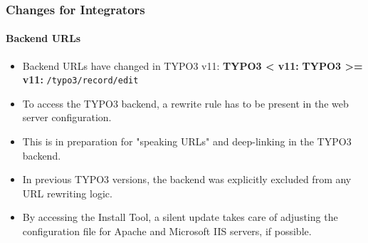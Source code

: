 %

\begin{frame}[fragile]
	\frametitle{Changes for Integrators}
	\framesubtitle{Backend URLs}

	\begin{itemize}
		\item Backend URLs have changed in TYPO3 v11:\newline
			\small\textbf{TYPO3 < v11:}\normalsize\newline
			\small\textbf{TYPO3 >= v11:}\normalsize\newline
			\smaller\texttt{/typo3/record/edit}\normalsize

		\item To access the TYPO3 backend, a rewrite rule has to be present in
			the web server configuration.
		\item This is in preparation for "speaking URLs" and deep-linking in the
			TYPO3 backend.
		\item In previous TYPO3 versions, the backend was explicitly excluded
			from any URL rewriting logic.
		\item By accessing the Install Tool, a silent update takes care of
			adjusting the configuration file for Apache and Microsoft IIS
			servers, if possible.

	\end{itemize}
\end{frame}

